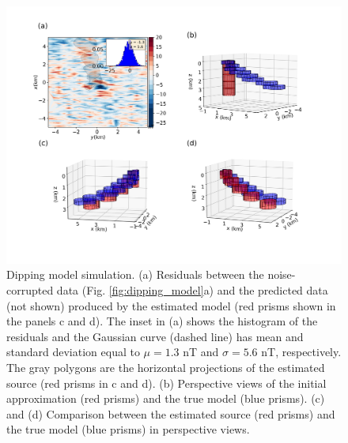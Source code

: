\begin{figure}
    \centering
    \includegraphics[width=\linewidth]{figures/inclined-l2-solution.png}
    \caption{Dipping model simulation. (a) Residuals between the  noise-corrupted data (Fig. \ref{fig:dipping_model}a) and the predicted data (not shown) produced by the estimated model (red prisms shown in the panels c and d). The inset in (a) shows the histogram of the residuals and the Gaussian curve (dashed line) has mean and standard deviation equal 
    to $\mu = 1.3$ nT and $\sigma=5.6$ nT, respectively. 
    The gray polygons are the horizontal projections of the estimated source (red prisms in c and d).
     (b) Perspective views of the initial approximation (red prisms) and the true model (blue prisms). 
     (c) and (d) Comparison between the estimated source (red prisms) and the true model (blue prisms) in perspective views.     
}
    \label{fig:dipping_results}
\end{figure}



